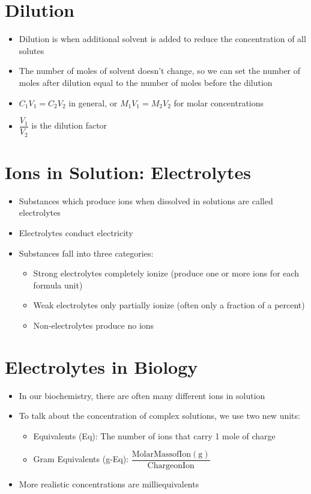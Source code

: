 \documentclass[12pt, openany, letterpaper]{memoir}
\begin{document}
\section{Dilution}
\begin{itemize}
	\item Dilution is when additional solvent is added to reduce the concentration of all solutes
	\item The number of moles of solvent doesn't change, so we can set the number of moles after dilution equal to the number of moles before the dilution
	\item $C_1V_1=C_2V_2$ in general, or $M_1V_1=M_2V_2$ for molar concentrations
	\item $\dfrac{V_1}{V_2}$ is the dilution factor
\end{itemize}
\section{Ions in Solution: Electrolytes}
\begin{itemize}
	\item Substances which produce ions when dissolved in solutions are called electrolytes
	\item Electrolytes conduct electricity
	\item Substances fall into three categories:
	\begin{itemize}
		\item Strong electrolytes completely ionize (produce one or more ions for each formula unit)
		\item Weak electrolytes only partially ionize (often only a fraction of a percent)
		\item Non-electrolytes produce no ions
	\end{itemize}
\end{itemize}
\section{Electrolytes in Biology}
\begin{itemize}
	\item In our biochemistry, there are often many different ions in solution
	\item To talk about the concentration of complex solutions, we use two new units:
	\begin{itemize}
		\item Equivalents (Eq): The number of ions that carry 1 mole of charge
		\item Gram Equivalents (g-Eq): $\dfrac{\mathrm{Molar Mass of Ion (g)}}{\mathrm{Charge on Ion}}$
	\end{itemize}
	\item More realistic concentrations are milliequivalents
\end{itemize}
\end{document}
